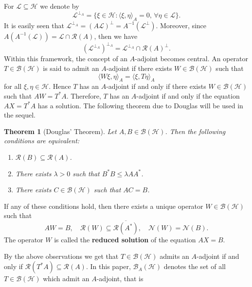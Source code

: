 \documentclass{amsart}
\newtheorem{thm}{Theorem}[section]
\theoremstyle{definition}\newtheorem{defn}[thm]{Definition}
\theoremstyle{remark}
\numberwithin{equation}{section}
\begin{document}
For $\mathcal{L} \subseteq \mathcal{H}$ we denote by
\[
\mathcal{L}^{\perp_A} = \{ \xi \in \mathcal{H} : \langle \xi, \eta \rangle_A = 0, \, \forall \eta \in \mathcal{L} \}.
\]
It is easily seen that $\mathcal{L}^{\perp_A} = (A\mathcal{L})^\perp = A^{-1}(\mathcal{L}^\perp)$. Moreover, since $A(A^{-1}(\mathcal{L})) = \mathcal{L} \cap \mathcal{R}(A)$, then we have
\[
(\mathcal{L}^{\perp_A})^{\perp_A} = \mathcal{L}^{\perp_A} \cap \mathcal{R}(A)^{\perp}.
\]
Within this framework, the concept of an \( A \)-adjoint becomes central. An operator \( T \in \mathcal{B}(\mathcal{H}) \) is said to admit an \( A \)-adjoint if there exists $W \in \mathcal{B}(\mathcal{H})$ such that 
\[
\langle W\xi, \eta \rangle_A = \langle \xi, T\eta \rangle_A
\]
for all $\xi, \eta \in \mathcal{H}$. Hence $T$ has an $A$-adjoint if and only if there exists $W \in \mathcal{B}(\mathcal{H})$ such that $AW = T^* A$. Therefore, $T$ has an $A$-adjoint if and only if the equation $AX = T^* A$ has a solution. The following theorem due to Douglas \cite{Douglas1966} will be used in the sequel.



\begin{thm}[Douglas' Theorem]\label{t1.1}
    Let \( A, B \in \mathcal{B}(\mathcal{H}) \). Then the following conditions are equivalent:
    \begin{enumerate}
        \item \( \mathcal{R}(B) \subseteq \mathcal{R}(A) \).
        \item There exists \( \lambda > 0 \) such that \( B^* B \leq \lambda A A^* \).
        \item There exists \(C \in \mathcal{B}(\mathcal{H}) \) such that \( AC = B \).
    \end{enumerate}
\end{thm}

If any of these conditions hold, then there exists a unique operator \( W \in \mathcal{B}(\mathcal{H}) \) such that
\[
AW = B, \quad \mathcal{R}(W) \subseteq \overline{\mathcal{R}(A^*)}, \quad \mathcal{N}(W) = \mathcal{N}(B).
\]
The operator \( W \) is called the \textbf{reduced solution} of the equation \( AX = B \).




By the above observations we get that $T \in \mathcal{B}(\mathcal{H})$ admits an $A$-adjoint if and only if
 $\mathcal{R}(T^* A) \subseteq \mathcal{R}(A)$. In this paper, $\mathcal{B}_A(\mathcal{H})$ denotes the set of all $T \in \mathcal{B}(\mathcal{H})$ which admit an $A$-adjoint, that is
\end{document}

